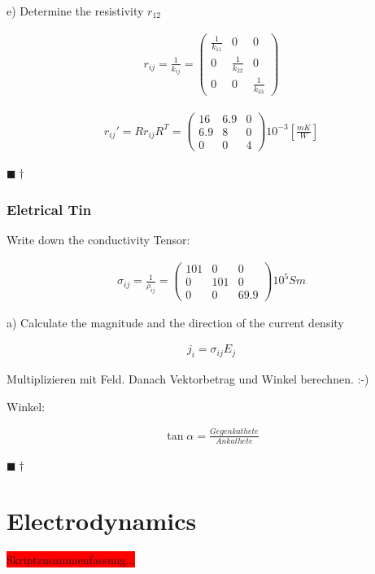 \documentclass[a4paper]{scrartcl}
\newcommand{\qed}{\begin{flushright}
$\blacksquare \dagger$ \end{flushright}}
\begin{document}
e) Determine the resistivity $r_{12}$

\begin{align}
r_{ij}=\frac{1}{k_{ij}}=\begin{pmatrix}
\frac{1}{k_{11}} & 0 & 0 \\
0 & \frac{1}{k_{22}} & 0 \\
0 & 0 & \frac{1}{k_{33}}
\end{pmatrix}
\end{align}

\begin{align}
r_{ij}'=Rr_{ij}R^{T} = \begin{pmatrix}
16 & 6.9 & 0 \\
6.9 & 8 & 0 \\
0 & 0 & 4
\end{pmatrix}
10^{-3}[\frac{mK}{W}] 
\end{align}
\qed




\subsubsection{Eletrical Tin}
Write down the conductivity Tensor:

\begin{align}
\sigma_{ij} = \frac{1}{\rho_{ij}}= \begin{pmatrix}
101 & 0 & 0 \\
0 & 101 & 0 \\
0 & 0 & 69.9 
\end{pmatrix}
10^5 Sm
\end{align}

a) Calculate the magnitude and the direction of the current density

\begin{align}
j_i=\sigma_{ij}E_j
\end{align}

Multiplizieren mit Feld. Danach Vektorbetrag und Winkel berechnen. :-)

Winkel:

\begin{align}
\tan{\alpha}=\frac{Gegenkathete}{Ankathete}
\end{align}
\qed

\section{Electrodynamics}

\colorbox{red}{Skriptzusammenfassung...}
\end{document}
